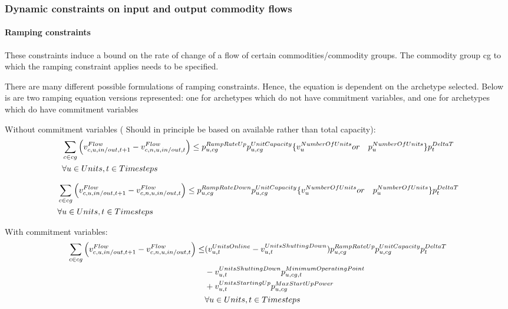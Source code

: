 \subsubsection{Dynamic constraints on input and output commodity flows}
\paragraph{Ramping constraints} These constraints induce a bound on the rate of change of a flow of certain commodities/commodity groups. The commodity group cg to which the ramping constraint applies needs to be specified.

There are many different possible formulations of ramping constraints. Hence, the equation is dependent on the archetype selected. Below is are two ramping equation versions represented: one for archetypes which do not have commitment variables, and one for archetypes which do have commitment variables

Without commitment variables ({\color{red} Should in principle be based on available rather than total capacity}):
\begin{align} \label{eq:updwardrampingconstraintwithoutcommitmentvariables}
&\sum_{\commodity \in \commoditygroup} \Big( \vFlow[\commodity,\unit,in/out,\timestep+1] - \vFlow \Big) \le \pRampRateUp \pUnitCapacity \{\vNumberOfUnits or \quad \pNumberOfUnits\} \pDeltaT \nonumber \\
&\forall \units, \timesteps
\end{align}

\begin{align} \label{eq:downdwardrampingconstraintwithoutcommitmentvariables}
&\sum_{\commodity \in \commoditygroup} \Big( \vFlow[\commodity,\unit,in/out,\timestep+1] - \vFlow \Big) \le \pRampRateDown \pUnitCapacity \{\vNumberOfUnits or \quad \pNumberOfUnits\}\pDeltaT \nonumber \\
& \forall \units, \timesteps
\end{align}



With commitment variables:
\begin{align} \label{eq:updwardrampingconstraintwithcommitmentvariables}
\sum_{\commodity \in cg} \Big( \vFlow[\commodity,\unit,in/out,\timestep+1] - \vFlow \Big) \le & (\vUnitsOnline-\vUnitsShuttingDown) \pRampRateUp \pUnitCapacity \pDeltaT \nonumber \\
& - \vUnitsShuttingDown \pMinimumOperatingPoint \nonumber \\
& +\vUnitsStartingUp \pMaxStartUpPower \nonumber \\
& \forall \units, \timesteps
\end{align}

